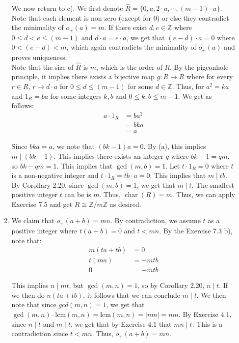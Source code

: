 \documentclass{article}
\begin{document}
\begin{enumerate}
\begin{enumerate}
    We now return to c). We first denote $\hat{R} = \{0, a, 2 \cdot a, \cdots , (m-1) \cdot a \}$. Note that each element is non-zero (except for $0$) or else they contradict the minimality of $o_+(a) = m$. If there exist $d, e \in \mathbb{Z}$ where $0 \leq d < e \leq (m-1)$ and $d \cdot a = e \cdot a$, we get that $(e - d) \cdot a = 0$ where $0 < (e - d) < m$, which again contradicts the minimality of $o_+(a)$ and proves uniqueness. \\

    Note that the size of $\hat{R}$ is $m$, which is the order of $R$. By the pigeonhole principle, it implies there exists a bijective map $g: R \rightarrow R$ where for every $r \in R$, $r \mapsto d \cdot a$ for $0 \leq d \leq (m - 1)$ for some $d \in \mathbb{Z}$. Thus, for $a^2 = ka$ and $1_R = ba$ for some integers $k, b$ and $0 \leq k, b \leq m-1$. We get as follows:
    \begin{align*}
    a \cdot 1_R &= ba^2\\
    &= bka \\
    &= a
    \end{align*}
    
    Since $bka = a$, we note that $(bk - 1) a = 0$. By (a), this implies $m \mid (bk - 1)$. This implies there exists an integer $q$ where $bk - 1 = qm$, so $bk - qm = 1$. This implies that $\gcd(m, b) = 1$. Let $t \cdot 1_R = 0$ where $t$ is a non-negative integer and $t \cdot 1_R = tb \cdot a = 0$. This implies that $m \mid tb$. By Corollary 2.20, since $\gcd(m, b) = 1$, we get that $m \mid t$. The smallest positive integer $t$ can be is $m$. Thus, $\operatorname{char}(R) = m$. Thus, we can apply Exercise 7.5 and get $R \cong \mathbb{Z} / m \mathbb{Z}$ as desired. \\


    \item 
    We claim that $o_+(a+b) = mn$. By contradiction, we assume $t$ as a positive integer where $t(a + b) = 0$ and $t < mn$. By the Exercise 7.3 b), note that:
    \begin{align*}
    m(ta + tb) &= 0 \\ 
        t(ma) &= -mtb \\
        0 &= -mtb 
    \end{align*}

    This implies $n \mid mt$, but $\gcd(m, n) = 1$, so by Corollary 2.20, $n \mid t$. If we then do $n(ta + tb)$, it follows that we can conclude $m \mid t$. We then note that since $gcd(m,n) = 1$, we get that $\gcd(m, n) \cdot \text{lcm}(m, n) = \text{lcm}(m, n) = |nm| = nm$. By Exercise 4.1, since $n \mid t$ and $m \mid t$, we get that by Exercise 4.1 that $mn \mid t$. This is a contradiction since $t < mn$. Thus, $o_+(a + b) = mn$. \\ 


\end{enumerate}
\end{enumerate}
\end{document}

